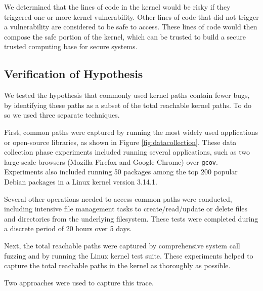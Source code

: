 We determined that the lines of code in the kernel would be risky
if they triggered one or more kernel vulnerability. Other lines of code
that did not trigger a vulnerability are considered to be safe to access.
These lines of code would then compose the safe portion of the kernel,
which can be trusted to build a secure trusted computing base for secure systems.

\subsection{Verification of Hypothesis}
\label{Verification-of-Hypothesis}

We tested the hypothesis that commonly used kernel paths contain fewer bugs,
by identifying these paths as a subset of the total reachable kernel paths. To do so we
used three separate techniques.

First, common paths were captured by running the most widely used applications
or open-source libraries, as shown in Figure \ref{fig:datacollection}.
These data collection phase experiments included running several applications,
such as two large-scale browsers (Mozilla Firefox and Google Chrome)
 over \texttt{gcov}. Experiments also included running 50 packages among
 the top 200 popular Debian packages \cite{Top-Packages}
 in a Linux kernel version 3.14.1.

Several other operations needed to access common paths were conducted, including
intensive file management tasks to create/read/update or delete files and
directories from the underlying filesystem. These tests were completed
during a discrete period of 20 hours over 5 days.

Next, the total reachable paths were captured by comprehensive system call
fuzzing and by running the Linux kernel test suite. These experiments helped
 to capture the total reachable paths in the kernel as thoroughly as possible.

Two approaches were used to capture this trace.

